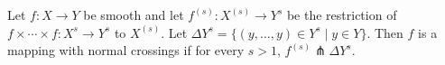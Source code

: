 Let $f: X \to Y$ be smooth and let $f^{(s)}: X^{(s)} \to Y^{s}$ be the restriction of $f \times \cdots \times f: X^{s} \to Y^{s}$ to $X^{(s)}$. Let $\Delta Y^{s} = \{(y, \ldots, y) \in Y^{s} \mid y \in Y\}$. Then $f$ is a mapping with normal crossings if for every $s > 1$, $f^{(s)} \pitchfork \Delta Y^{s}$.
